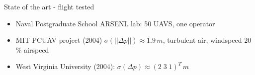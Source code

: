 \documentclass[12pt,svgnames,table,draft=false]{beamer}
\begin{document}
\begin{frame}{State of the art - flight tested}
\centering

\begin{tcolorbox}[width=.99\textwidth,
colback={gray!10!},
standard jigsaw,
title=Guidance,
opacityback=.8,  %
]  
    \begin{itemize}
    \item Naval Postgraduate School ARSENL lab: 50 UAVS, one operator\cite{ARSENL50UAVS}
    \end{itemize}
    \end{tcolorbox}
    
    \begin{tcolorbox}[width=.99\textwidth,
    colback={gray!10!},
    standard jigsaw,
    title=Control performance,
    opacityback=.8,  %
    ]  
        \begin{itemize}
          \item MIT PCUAV project \cite{Park2004} (2004) $\sigma(||\Delta p||) \approx 1.9 \, m$, turbulent air, windspeed 20 \% airspeed
    
          \item West Virginia University \cite{gu2006design} (2004): $\sigma(\Delta p) \approx       
          (2 \; 3 \; 1)^T
           \, m$
           
        \end{itemize}
        \end{tcolorbox}
    
\end{frame}

\usebackgroundtemplate{}

\end{document}
